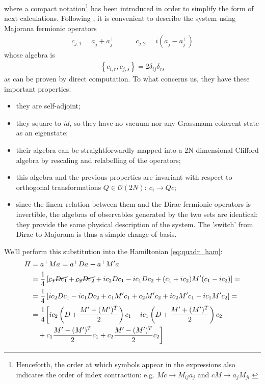 \documentclass[a4paper,11pt]{article}
\newcommand{\np}{\vskip 1.3cm}
\begin{document}
 where a compact notation\footnote{Henceforth, the order at which symbols appear in the expressions also indicates the order of index contraction: e.g. $Mc\rightarrow M_{ij}a_j$ and $cM \rightarrow a_j M_{ji}$.} has been introduced in order to simplify the form of next calculations. \np
 Following \cite{Eisert2010}, it is convenient to describe the system using Majorana fermionic operators
 \begin{align}
  c_{j, 1} = a_j^{ }+a_j^{+} \quad \quad \quad
  c_{j, 2} = i(a_j^{ }-a_j^{+})
  \label{eq:def_majorana}
 \end{align}
  whose algebra is 
 \begin{align}
  \left\{c_{i,r},c_{j,s}\right\} = 2\delta_{ij}\delta_{rs}
  \label{eq:algebra_majorana}
 \end{align}
  as can be proven by direct computation. To what concerns us, they have these important properties:
  \begin{itemize}
   \item they are self-adjoint;
   \item they square to $id$, so they have no vacuum nor any Grassmann coherent state as an eigenstate;
   \item their algebra can be straightforwardly mapped into a 2N-dimensional Clifford algebra by rescaling and relabelling of the operators; 
   \item this algebra and the previous properties are invariant with respect to orthogonal transformations $Q\in\mathcal{O}(2N):\ c_i\rightarrow Qc$;
   \item since the linear relation between them and the Dirac fermionic operators is invertible, the algebras of observables generated by the two sets are identical: they provide the same physical description of the system. The 'switch' from Dirac to Majorana is thus a simple change of basis.\np
  \end{itemize}
  We'll perform this substitution into the Hamiltonian \ref{eq:quadr_ham}:
    \begin{align*}
     H &= a^+Ma^{ } = a^+Da^{ } + a^+M'a^{ }\notag\\
       &=\frac{1}{4}\left[\cancel{c_1Dc_1} + \cancel{c_2Dc_2} +ic_2Dc_1-ic_1Dc_2+(c_1+ic_2)M'(c_1-ic_2)\right] =  \notag\\
       &=\frac{1}{4}\left[ic_2Dc_1-ic_1Dc_2+c_1M'c_1 + c_2M'c_2 +ic_2M'c_1-ic_1M'c_2\right]=\notag \\
       &=\frac{1}{4}\bigg[ic_2\left(D+\frac{M'+(M')^T}{2}\right)c_1-ic_1\left(D+\frac{M'+(M')^T}{2}\right)c_2 +\notag\\
       &\ \ \ +c_1\frac{M'-(M')^T}{2}c_1+c_2\frac{M'-(M')^T}{2}c_2\bigg]\notag
   \end{align*}
\end{document}
